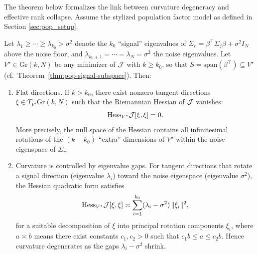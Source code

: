 \documentclass[twoside,11pt,letter]{article}
\begin{document}
The theorem below formalizes the link between curvature degeneracy and effective rank collapse. Assume the stylized population factor model as defined in Section \ref{sec:pop_setup}.
\begin{theorem}\label{thm:curv-erank}
Let $\lambda_1\ge\cdots\ge \lambda_{k_0}>\sigma^2$ denote the $k_0$ ``signal'' eigenvalues of $\Sigma_r = \beta^\top\Sigma_f \beta + \sigma^2 I_N$ above the noise floor, and $\lambda_{k_0+1}=\cdots=\lambda_N=\sigma^2$ the noise eigenvalues. Let $V^\star\in \mathrm{Gr}(k,N)$ be any minimizer of ${\mathcal{J}}$ with $k\ge k_0$, so that $S=\mathrm{span}(\beta^\top)\subseteq V^\star$ (cf.\ Theorem~\ref{thm:pop-signal-subspace}). Then:
\begin{enumerate}[label=(\roman*)]
\item {\rm Flat directions.} If $k>k_0$, there exist nonzero tangent directions $\xi\in T_{V^\star}\mathrm{Gr}(k,N)$ such that the Riemannian Hessian of ${\mathcal{J}}$ vanishes:
\begin{equation*}
\mathrm{Hess}_{V^\star}{\mathcal{J}}[\xi,\xi]=0.
\end{equation*}
More precisely, the null space of the Hessian contains all infinitesimal rotations of the $(k-k_0)$ ``extra'' dimensions of $V^\star$ within the noise eigenspace of $\Sigma_r$.
\item {\rm Curvature is controlled by eigenvalue gaps.} For tangent directions that rotate a signal direction (eigenvalue $\lambda_i$) toward the noise
eigenspace (eigenvalue $\sigma^2$), the Hessian quadratic form satisfies
\begin{equation}\label{eq:hess-gap}
\mathrm{Hess}_{V^\star}{\mathcal{J}}[\xi,\xi]\asymp\sum_{i=1}^{k_0}(\lambda_i-\sigma^2)\,\|\xi_i\|^2,
\end{equation}
for a suitable decomposition of $\xi$ into principal rotation components $\xi_i$, where $a\asymp b$ means there exist constants $c_1,c_2>0$ such that
$c_1 b \le a \le c_2 b$. Hence curvature degenerates as the gaps $\lambda_i-\sigma^2$ shrink.


\end{enumerate}
\end{theorem}
\end{document}
